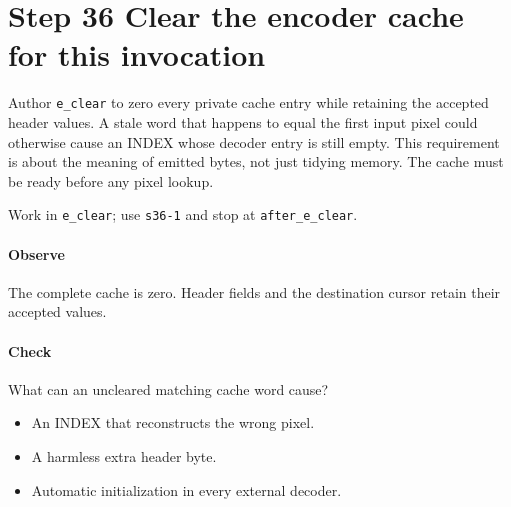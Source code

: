 \section{Step 36 Clear the encoder cache for this invocation}\label{qoi-s36}
Author \texttt{e\_clear} to zero every private cache entry while retaining the accepted header values. A stale word that happens to equal the first input pixel could otherwise cause an INDEX whose decoder entry is still empty. This requirement is about the meaning of emitted bytes, not just tidying memory. The cache must be ready before any pixel lookup.

Work in \texttt{e\_clear}; use \texttt{s36-1} and stop at \texttt{after\_e\_clear}.

\paragraph{Observe} The complete cache is zero. Header fields and the destination cursor retain their accepted values.

\paragraph{Check} What can an uncleared matching cache word cause?
\begin{itemize}
\item[A.] An INDEX that reconstructs the wrong pixel.
\item[B.] A harmless extra header byte.
\item[C.] Automatic initialization in every external decoder.
\end{itemize}
